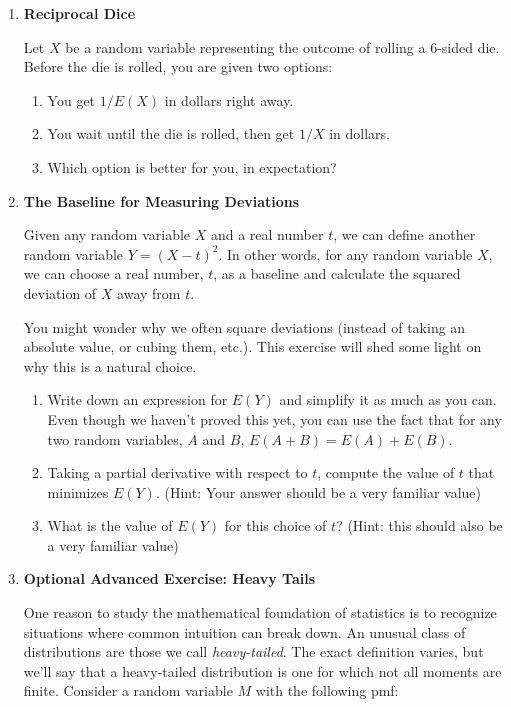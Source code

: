 \documentclass[12pt,a4paper]{article}
\numberwithin{equation}{subsection}
\begin{document}
\begin{enumerate}
\begin{enumerate}
\end{enumerate}

\item \textbf{Reciprocal Dice}

Let $X$ be a random variable representing the outcome of rolling a 6-sided die.  Before the die is rolled, you are given two options:

\begin{enumerate}
\item You get $1/E(X)$ in dollars right away.
\item You wait until the die is rolled, then get $1/X$ in dollars.
\item Which option is better for you, in expectation?
\end{enumerate}



\item \textbf{The Baseline for Measuring Deviations}

Given any random variable $X$ and a real number $t$, we can define another random variable $Y = (X - t)^2$. In other words, for any random variable $X$, we can choose a real number, $t$, as a baseline and calculate the squared deviation of $X$ away from $t$.

You might wonder why we often square deviations (instead of taking an absolute value, or cubing them, etc.).  This exercise will shed some light on why this is a natural choice.

\begin{enumerate}
\item Write down an expression for $E(Y)$ and simplify it as much as you can.  Even though we haven't proved this yet, you can use the fact that for any two random variables, $A$ and $B$, $E(A + B) = E(A) + E(B)$.
\item Taking a partial derivative with respect to $t$, compute the value of $t$ that minimizes $E(Y)$.  (Hint: Your answer should be a very familiar value)
\item What is the value of $E(Y)$ for this choice of $t$?
(Hint: this should also be a very familiar value)
\end{enumerate}

\item \textbf{Optional Advanced Exercise: Heavy Tails}

One reason to study the mathematical foundation of statistics is to recognize situations where common intuition can break down.  An unusual class of distributions are those we call \textit{heavy-tailed}.  The exact definition varies, but we'll say that a heavy-tailed distribution is one for which not all moments are finite.  Consider a random variable $M$ with the following pmf:


\end{enumerate}
\end{document}
